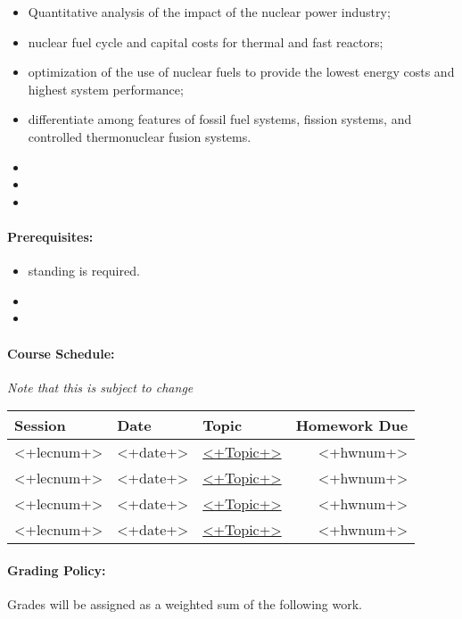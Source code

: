 \documentclass[11pt, a4paper]{article}
\begin{document}
\begin{itemize}
\item Quantitative analysis of the impact of the nuclear power industry; 
\item nuclear fuel cycle and capital costs for thermal and fast reactors; 
\item optimization of the use of nuclear fuels to provide the lowest energy costs and highest system performance; 
\item differentiate among features of fossil fuel systems, fission systems, and controlled thermonuclear fusion systems.
\item <+objective+>
\item <+objective+>
\item <+objective+>
\end{itemize}

\paragraph{Prerequisites:} 
\begin{itemize}
\item <+standing+> standing is required.
\item <+required courses+>
\item <+other+>
\end{itemize}

\paragraph{Course Schedule:}
\textit{Note that this is subject to change}

\begin{table}[h]
\begin{tabularx}{\textwidth}{llXr}
\textbf{Session} & \textbf{Date} & \textbf{Topic} & \textbf{Homework Due}\\
\hline
<+lecnum+> & <+date+> & \href{<+url>}{<+Topic+>} & <+hwnum+>\\
<+lecnum+> & <+date+> & \href{<+url>}{<+Topic+>} & <+hwnum+>\\
<+lecnum+> & <+date+> & \href{<+url>}{<+Topic+>} & <+hwnum+>\\
<+lecnum+> & <+date+> & \href{<+url>}{<+Topic+>} & <+hwnum+>\\
\hline
\end{tabularx}
\end{table}

\paragraph{Grading Policy:} Grades will be assigned as a weighted sum of the following work. 
\end{document}

